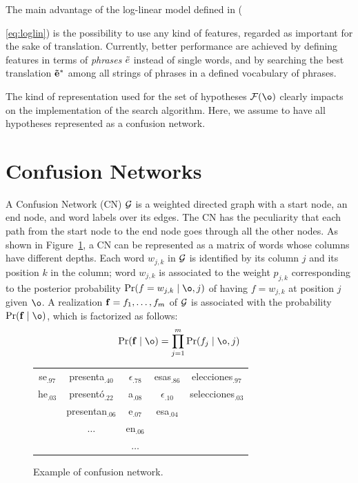 \documentclass[10pt]{report}
\theoremstyle{plain}
\begin{document}
\noindent
The main advantage of the log-linear model defined in ({\ref{eq:loglin}) is
the possibility to use any kind of features, regarded as important for
the sake of translation. Currently,  better  performance  are  achieved by  defining
features  in  terms of  {\em  phrases} $\tilde{e}$  \cite{zens02,koehn03,federico05a} instead of single words, 
and by searching the best translation ${\bf \tilde{e}}^*$  among all  strings  of phrases 
in  a  defined vocabulary of phrases.

\noindent
The kind of representation used for the set of hypotheses  ${\cal F}(\o)$  clearly 
impacts on the implementation  of the search algorithm. Here, we assume to 
have all hypotheses represented as a confusion network.

\section{Confusion Networks}
\label{sec:cn}
\noindent
A Confusion Network (CN) ${\cal  G}$ is a weighted directed graph with
a start node, an end node, and word labels over its edges.  The CN has
the peculiarity  that each path  from the start  node to the  end node
goes    through    all    the    other    nodes.     As    shown    in
Figure~\ref{fig:CN-matrix}, a CN can be represented as a matrix of words
whose columns  have different depths.   Each word $w_{j,k}$  in ${\cal
G}$  is identified  by its  column  $j$ and  its position  $k$ in  the
column;  word   $w_{j,k}$  is  associated  to   the  weight  $p_{j,k}$
corresponding to the posterior probability $\Pr(f=w_{j,k} \mid \o, j)$
of  having  $f=w_{j,k}$ at  position  $j$  given  $\o$.  A realization 
${\bf f}=f_1,  \ldots, f_m$ of ${\cal G}$  is associated with
the probability $\Pr(\F\mid \o)$, which is factorized as follows:
\begin{equation}
\Pr (\F \mid \o)= \prod_{j=1}^m \Pr(f_j\mid \o, j)
\label{eq:CN-posterior}
\end{equation}

\begin{figure}
\begin{center}
\begin{tabular}{c|c|c|c|c}
se$_{.97}$ &  presenta$_{.40}$  & $\epsilon_{.78}$& esas$_{.86}$& elecciones$_{.97}$\\
he$_{.03}$ &  present\'o$_{.22}$  & a$_{.08}$           & $\epsilon_{.10}$& selecciones$_{.03}$\\
                     &  presentan$_{.06}$ & e$_{.07}$            & esa$_{.04}$&     \\
                       &  $\ldots$                    & en$_{.06}$          &                     &    \\
                      &                                    & $\ldots$                &                      &\\
\end{tabular}
\end{center}
\caption{Example of confusion network.}
\label{fig:CN-matrix}
\end{figure}


}
\end{document}
